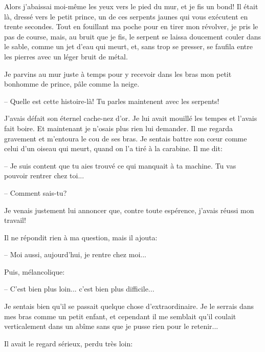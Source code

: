 \documentclass[a4paper]{report}
\begin{document}

Alors j'abaissai moi-même les yeux vers le pied du mur, et je fis un bond! Il était là, dressé vers le petit prince, un de ces serpents jaunes qui vous exécutent en trente secondes. Tout en fouillant ma poche pour en tirer mon révolver, je pris le pas de course, mais, au bruit que je fis, le serpent se laissa doucement couler dans le sable, comme un jet d'eau qui meurt, et, sans trop se presser, se faufila entre les pierres avec un léger bruit de métal.

Je parvins au mur juste à temps pour y recevoir dans les bras mon petit bonhomme de prince, pâle comme la neige.

-- Quelle est cette histoire-là! Tu parles maintenent avec les serpents!

J'avais défait son éternel cache-nez d'or. Je lui avait mouillé les tempes et l'avais fait boire. Et maintenant je n'osais plus rien lui demander. Il me regarda gravement et m'entoura le cou de ses bras. Je sentais battre son cœur comme celui d'un oiseau qui meurt, quand on l'a tiré à la carabine. Il me dit:

-- Je suis content que tu aies trouvé ce qui manquait à ta machine. Tu vas pouvoir rentrer chez toi...

-- Comment sais-tu?

Je venais justement lui annoncer que, contre toute espérence, j'avais réussi mon travail!

Il ne répondit rien à ma question, mais il ajouta:

-- Moi aussi, aujourd'hui, je rentre chez moi...

Puis, mélancolique:

-- C'est bien plus loin... c'est bien plus difficile...

Je sentais bien qu'il se passait quelque chose d'extraordinaire. Je le serrais dans mes bras comme un petit enfant, et cependant il me semblait qu'il coulait verticalement dans un abîme sans que je pusse rien pour le retenir...

Il avait le regard sérieux, perdu très loin:
\end{document}
